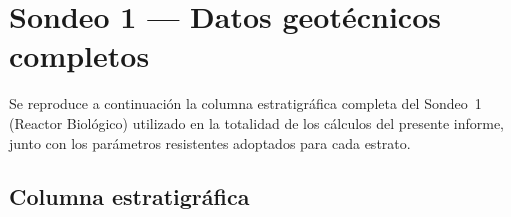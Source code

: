 \chapter{Sondeo 1 --- Datos geotécnicos completos}
\label{anx:sondeo}

Se reproduce a continuación la columna estratigráfica completa del Sondeo~1
(Reactor Biológico) utilizado en la totalidad de los cálculos del presente
informe, junto con los parámetros resistentes adoptados para cada estrato.

\section*{Columna estratigráfica}


